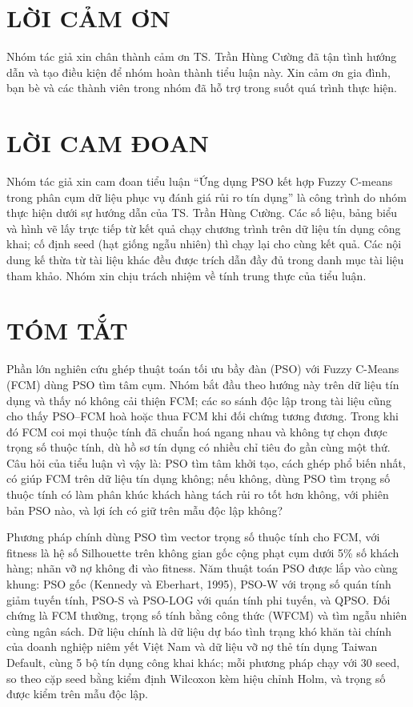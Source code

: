 \documentclass[a4paper,12pt,oneside]{report}
\newcommand{\cauHoiTong}{PSO tìm tâm khởi tạo, cách ghép phổ biến nhất, có giúp FCM trên dữ liệu tín dụng không; nếu không,
dùng PSO tìm trọng số thuộc tính có làm phân khúc khách hàng tách rủi ro tốt hơn không, với phiên bản PSO nào, và lợi ích có
giữ trên mẫu độc lập không?}
\begin{document}




\newpage
{}
\setcounter{page}{1}

\chapter*{LỜI CẢM ƠN}

Nhóm tác giả xin chân thành cảm ơn TS. Trần Hùng Cường đã tận tình hướng dẫn và
tạo điều kiện để nhóm hoàn thành tiểu luận này. Xin cảm ơn gia đình, bạn bè và các
thành viên trong nhóm đã hỗ trợ trong suốt quá trình thực hiện.

\newpage
\chapter*{LỜI CAM ĐOAN}

Nhóm tác giả xin cam đoan tiểu luận ``Ứng dụng PSO kết hợp Fuzzy C-means trong phân
cụm dữ liệu phục vụ đánh giá rủi ro tín dụng'' là công trình do nhóm thực hiện dưới
sự hướng dẫn của TS. Trần Hùng Cường. Các số liệu, bảng biểu và hình vẽ lấy
trực tiếp từ kết quả chạy chương trình trên dữ liệu tín dụng công khai; cố định seed
(hạt giống ngẫu nhiên) thì chạy lại cho cùng kết quả. Các nội dung kế thừa từ tài liệu khác đều được trích dẫn đầy đủ trong danh
mục tài liệu tham khảo. Nhóm xin chịu trách nhiệm về tính trung thực của tiểu luận.

\newpage
\chapter*{TÓM TẮT}

Phần lớn nghiên cứu ghép thuật toán tối ưu bầy đàn (PSO) với Fuzzy C-Means (FCM) dùng PSO tìm tâm cụm. Nhóm bắt đầu theo
hướng này trên dữ liệu tín dụng và thấy nó không cải thiện FCM; các so sánh độc lập trong tài liệu cũng cho thấy PSO--FCM hoà
hoặc thua FCM khi đối chứng tương đương. Trong khi đó FCM coi mọi thuộc tính đã chuẩn hoá ngang nhau và không tự chọn được
trọng số thuộc tính, dù hồ sơ tín dụng có nhiều chỉ tiêu đo gần cùng một thứ. Câu hỏi của tiểu luận vì vậy là: \cauHoiTong

Phương pháp chính dùng PSO tìm vector trọng số thuộc tính cho FCM, với fitness là hệ số Silhouette trên không gian gốc cộng
phạt cụm dưới 5\% số khách hàng; nhãn vỡ nợ không đi vào fitness. Năm thuật toán PSO được lắp vào cùng khung: PSO gốc (Kennedy
và Eberhart, 1995), PSO-W với trọng số quán tính giảm tuyến tính, PSO-S và PSO-LOG với quán tính phi tuyến, và QPSO. Đối
chứng là FCM thường, trọng số tính bằng công thức (WFCM) và tìm ngẫu nhiên cùng ngân sách. Dữ liệu chính là dữ liệu dự báo tình
trạng khó khăn tài chính của doanh nghiệp niêm yết Việt Nam và dữ liệu vỡ nợ thẻ tín dụng Taiwan Default, cùng 5 bộ tín dụng công khai
khác; mỗi phương pháp chạy với 30 seed, so theo cặp seed bằng kiểm định Wilcoxon kèm hiệu chỉnh Holm, và trọng số được kiểm
trên mẫu độc lập.
\end{document}

